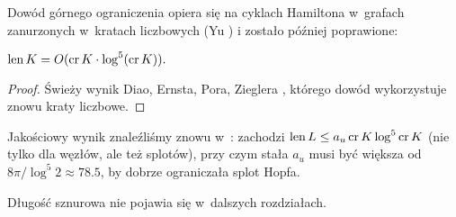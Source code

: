 Dowód górnego ograniczenia opiera się na cyklach Hamiltona w~grafach zanurzonych w~kratach liczbowych (Yu \cite{yu04}) i zostało później poprawione:


\begin{proposition}
    $\operatorname{len} K = O(\operatorname{cr} K \cdot \log^5(\operatorname{cr} K)).$
\end{proposition}

\begin{proof}
    Świeży wynik Diao, Ernsta, Pora, Zieglera \cite{diao19}, którego dowód wykorzystuje znowu kraty liczbowe.
\end{proof}

Jakościowy wynik znaleźliśmy znowu w~\cite{klotz21}: zachodzi $\operatorname{len} L \le a_u \operatorname{cr} K \log^5 \operatorname{cr} K$ (nie tylko dla węzłów, ale też splotów), przy czym stała $a_u$ musi być większa od $8\pi/\log^5 2 \approx 78.5$, by dobrze ograniczała splot Hopfa.

Długość sznurowa nie pojawia się w~dalszych rozdziałach.

%


